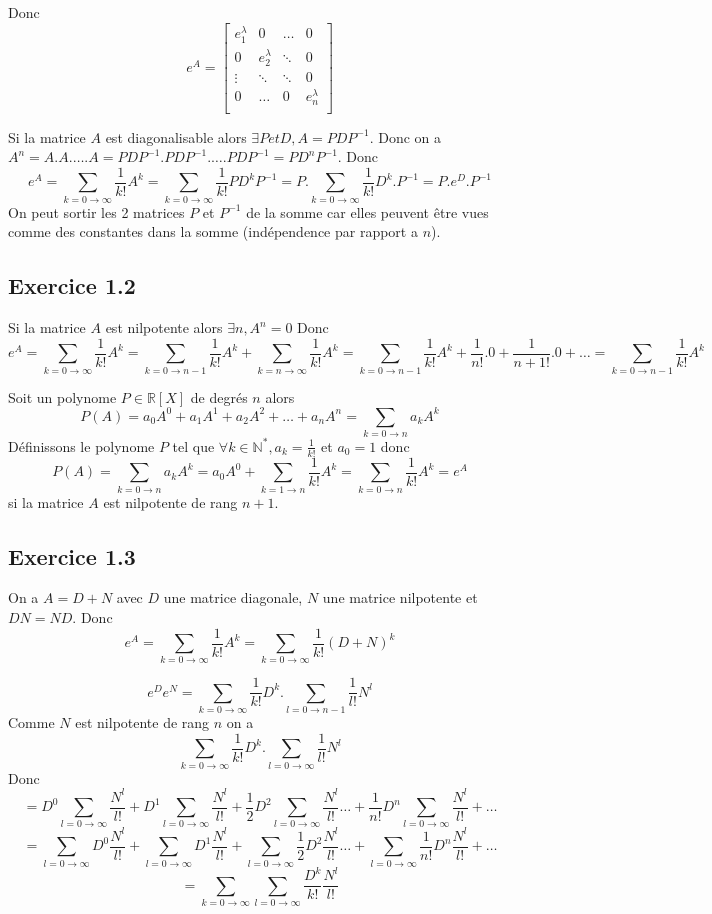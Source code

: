 \documentclass[]{book}
\theoremstyle{definition}
\newcommand{\bb}[1]{\mathbb{#1}}
\newcommand{\R}{\bb{R}}
\newcommand{\N}{\bb{N}}
\begin{document}
Donc
$$
e^A = 
\begin{bmatrix}
    e^\lambda_1 & 0 & \ldots & 0 \\    
    0 & e^\lambda_2  & \ddots & 0 \\
    \vdots & \ddots & \ddots & 0 \\    
    0 & \ldots & 0 & e^\lambda_n\\
\end{bmatrix}   
$$

Si la matrice $A$ est diagonalisable alors $\exists P et D, A = PDP^{-1}$. Donc on a $A^n = A.A. \ldots . A = PDP^{-1}.PDP^{-1}.\ldots.PDP^{-1} = PD^nP^{-1}$. Donc
$$
e^A = \sum_{k = 0 \to \infty}{\frac{1}{k!}A^k} = \sum_{k = 0 \to \infty}{\frac{1}{k!}PD^kP^{-1}} = P.\sum_{k = 0 \to \infty}{\frac{1}{k!}D^k}.P^{-1} = P.e^D.P^{-1}
$$
On peut sortir les 2 matrices $P$ et $P^{-1}$ de la somme car elles peuvent \^etre vues comme des constantes dans la somme (ind\'ependence par rapport a $n$).

\subsection*{Exercice 1.2}
Si la matrice $A$ est nilpotente alors $\exists n, A^n = 0$ Donc
$$
e^A = \sum_{k = 0 \to \infty}{\frac{1}{k!}A^k} = \sum_{k = 0 \to n-1}{\frac{1}{k!}A^k} + \sum_{k = n \to \infty}{\frac{1}{k!}A^k} = \sum_{k = 0 \to n-1}{\frac{1}{k!}A^k} + \frac{1}{n!}.0 + \frac{1}{n+1!}.0 + \ldots =  \sum_{k = 0 \to n-1}{\frac{1}{k!}A^k}
$$

Soit un polynome $P \in \R[X]$ de degr\'es $n$ alors 
$$
P(A) = a_0 A^0 + a_1 A^1 + a_2 A^2 + \ldots + a_n A^n = \sum_{k=0 \to n}{a_k A^k}
$$
D\'efinissons le polynome $P$ tel que $\forall k \in \N^{*}, a_k = \frac{1}{k!}$ et $a_0 = 1$
donc 
$$
P(A) = \sum_{k=0 \to n}{a_k A^k} = a_0 A^0 + \sum_{k=1 \to n}{\frac{1}{k!} A^k} = \sum_{k=0 \to n}{\frac{1}{k!} A^k}= e^A
$$
si la matrice $A$ est nilpotente de rang $n+1$. 

\subsection*{Exercice 1.3}
On a $A = D+N$ avec $D$ une matrice diagonale, $N$ une matrice nilpotente et $DN = ND$. Donc
$$
e^A = \sum_{k = 0 \to \infty}{\frac{1}{k!}A^k} = \sum_{k = 0 \to \infty}{\frac{1}{k!}(D+N)^k}
$$ 

$$
e^De^N = \sum_{k = 0 \to \infty}{\frac{1}{k!}D^k} . \sum_{l = 0 \to n-1}{\frac{1}{l!}N^l}
$$
Comme $N$ est nilpotente de rang $n$ on a 
$$
\sum_{k = 0 \to \infty}{\frac{1}{k!}D^k} . \sum_{l = 0 \to \infty}{\frac{1}{l!}N^l}
$$
Donc
$$
= D^0\sum_{l = 0 \to \infty}{\frac{N^{l}}{l!}} + D^1\sum_{l = 0 \to \infty}{\frac{N^{l}}{l!}} + \frac{1}{2}D^2\sum_{l = 0 \to \infty}{\frac{N^{l}}{l!}} \ldots +  \frac{1}{n!}D^n\sum_{l = 0 \to \infty}{\frac{N^{l}}{l!}} + \ldots
$$
$$
= \sum_{l = 0 \to \infty}{D^0\frac{N^{l}}{l!}} + \sum_{l = 0 \to \infty}{D^1\frac{N^{l}}{l!}} + \sum_{l = 0 \to \infty}{\frac{1}{2}D^2\frac{N^{l}}{l!}} \ldots +  \sum_{l = 0 \to \infty}{\frac{1}{n!}D^n\frac{N^{l}}{l!}} + \ldots
$$
$$
= \sum_{k = 0 \to \infty}\sum_{l = 0 \to \infty}{\frac{D^k}{k!}\frac{N^{l}}{l!}}
$$
\end{document}
